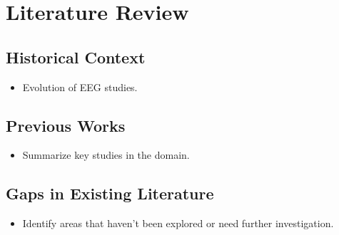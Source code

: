 \chapter{\rm\bfseries Literature Review}
\label{ch:chapter02}

\section{Historical Context}
\begin{itemize}
    \item Evolution of EEG studies.
\end{itemize}

\section{Previous Works}
\begin{itemize}
    \item Summarize key studies in the domain.
\end{itemize}

\section{Gaps in Existing Literature}
\begin{itemize}
    \item Identify areas that haven't been explored or need further investigation.
\end{itemize}
